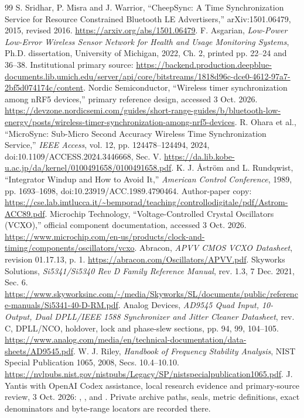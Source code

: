 \documentclass[11pt,letterpaper]{article}
\begin{document}
\begin{thebibliography}{99}
 S. Sridhar, P. Misra and J. Warrior, ``CheepSync: A Time Synchronization Service for Resource Constrained Bluetooth LE Advertisers,'' arXiv:1501.06479, 2015, revised 2016. \url{https://arxiv.org/abs/1501.06479}.
 F. Asgarian, \emph{Low-Power Low-Error Wireless Sensor Network for Health and Usage Monitoring Systems}, Ph.D. dissertation, University of Michigan, 2022, Ch. 2, printed pp. 22--24 and 36--38. Institutional primary source: \url{https://backend.production.deepblue-documents.lib.umich.edu/server/api/core/bitstreams/1818d96c-dce0-4612-97a7-2bf5d074174c/content}.
 Nordic Semiconductor, ``Wireless timer synchronization among nRF5 devices,'' primary reference design, accessed 3 Oct. 2026. \url{https://devzone.nordicsemi.com/guides/short-range-guides/b/bluetooth-low-energy/posts/wireless-timer-synchronization-among-nrf5-devices}.
 R. Ohara et al., ``MicroSync: Sub-Micro Second Accuracy Wireless Time Synchronization Service,'' \emph{IEEE Access}, vol. 12, pp. 124478--124494, 2024, doi:10.1109/ACCESS.2024.3446668, Sec. V. \url{https://da.lib.kobe-u.ac.jp/da/kernel/0100491658/0100491658.pdf}.
 K. J. \AA str\"om and L. Rundqwist, ``Integrator Windup and How to Avoid It,'' \emph{American Control Conference}, 1989, pp. 1693--1698, doi:10.23919/ACC.1989.4790464. Author-paper copy: \url{https://cse.lab.imtlucca.it/~bemporad/teaching/controllodigitale/pdf/Astrom-ACC89.pdf}.
 Microchip Technology, ``Voltage-Controlled Crystal Oscillators (VCXO),'' official component documentation, accessed 3 Oct. 2026. \url{https://www.microchip.com/en-us/products/clock-and-timing/components/oscillators/vcxo}.
 Abracon, \emph{APVV CMOS VCXO Datasheet}, revision 01.17.13, p. 1. \url{https://abracon.com/Oscillators/APVV.pdf}.
 Skyworks Solutions, \emph{Si5341/Si5340 Rev D Family Reference Manual}, rev. 1.3, 7 Dec. 2021, Sec. 6. \url{https://www.skyworksinc.com/-/media/Skyworks/SL/documents/public/reference-manuals/Si5341-40-D-RM.pdf}.
 Analog Devices, \emph{AD9545 Quad Input, 10-Output, Dual DPLL/IEEE 1588 Synchronizer and Jitter Cleaner Datasheet}, rev. C, DPLL/NCO, holdover, lock and phase-slew sections, pp. 94, 99, 104--105. \url{https://www.analog.com/media/en/technical-documentation/data-sheets/AD9545.pdf}.
 W. J. Riley, \emph{Handbook of Frequency Stability Analysis}, NIST Special Publication 1065, 2008, Secs. 10.4--10.10. \url{https://nvlpubs.nist.gov/nistpubs/Legacy/SP/nistspecialpublication1065.pdf}.
 J. Yantis with OpenAI Codex assistance, local research evidence and primary-source review, 3 Oct. 2026: , , and . Private archive paths, seals, metric definitions, exact denominators and byte-range locators are recorded there.
\end{thebibliography}
\end{document}
